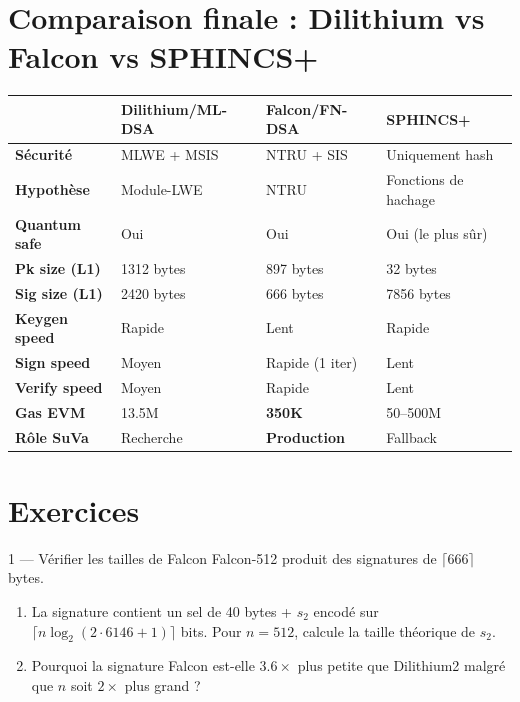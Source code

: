 \documentclass[12pt, a4paper]{article}
\begin{document}
\section{Comparaison finale : Dilithium vs Falcon vs SPHINCS+}

\begin{center}
\begin{tabular}{llll}
\toprule
& \textbf{Dilithium/ML-DSA} & \textbf{Falcon/FN-DSA} & \textbf{SPHINCS+} \\
\midrule
\textbf{Sécurité} & MLWE + MSIS & NTRU + SIS & Uniquement hash \\
\textbf{Hypothèse} & Module-LWE & NTRU & Fonctions de hachage \\
\textbf{Quantum safe} & Oui & Oui & Oui (le plus sûr) \\
\textbf{Pk size (L1)} & 1312 bytes & 897 bytes & 32 bytes \\
\textbf{Sig size (L1)} & 2420 bytes & 666 bytes & 7856 bytes \\
\textbf{Keygen speed} & Rapide & Lent & Rapide \\
\textbf{Sign speed} & Moyen & Rapide (1 iter) & Lent \\
\textbf{Verify speed} & Moyen & Rapide & Lent \\
\textbf{Gas EVM} & 13.5M & \textbf{350K} & 50--500M \\
\textbf{Rôle SuVa} & Recherche & \textbf{Production} & Fallback \\
\bottomrule
\end{tabular}
\end{center}

\section{Exercices}

\begin{exercice}{1 --- Vérifier les tailles de Falcon}
Falcon-512 produit des signatures de $\lceil 666 \rceil$ bytes.
\begin{enumerate}[label=\alph*)]
  \item La signature contient un sel de 40 bytes + $s_2$ encodé sur
        $\lceil n \log_2(2 \cdot 6146 + 1) \rceil$ bits.
        Pour $n = 512$, calcule la taille théorique de $s_2$.
  \item Pourquoi la signature Falcon est-elle $3.6\times$ plus petite
        que Dilithium2 malgré que $n$ soit $2\times$ plus grand ?
\end{enumerate}
\end{exercice}
\end{document}
